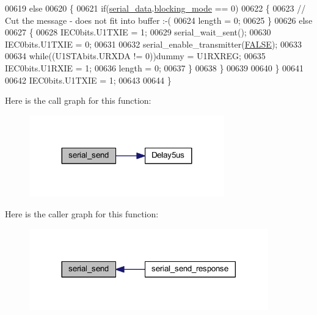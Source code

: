 \begin{DoxyCode}
00619         \textcolor{keywordflow}{else}
00620         \{
00621             \textcolor{keywordflow}{if}(\hyperlink{a00030_a77d3b77ccd59a0065642bf1ac7887b9d}{serial\_data}.\hyperlink{a00030_a758ac775caab1899af08024d4635f7e3}{blocking\_mode} == 0)
00622             \{
00623                 \textcolor{comment}{// Cut the message - does not fit into buffer :-(}
00624                 length = 0;
00625             \}
00626             \textcolor{keywordflow}{else}
00627             \{
00628                 IEC0bits.U1TXIE   = 1;
00629                 serial\_wait\_sent();
00630                 IEC0bits.U1TXIE   = 0;
00631 
00632                 serial\_enable\_transmitter(\hyperlink{a00040_aa93f0eb578d23995850d61f7d61c55c1}{FALSE});
00633 
00634                 \textcolor{keywordflow}{while}((U1STAbits.URXDA != 0))dummy = U1RXREG;
00635                 IEC0bits.U1RXIE   = 1;
00636                 length = 0;
00637             \}
00638         \}
00639 
00640     \}
00641 
00642     IEC0bits.U1TXIE   = 1;
00643 
00644 \}
\end{DoxyCode}


Here is the call graph for this function\+:
\nopagebreak
\begin{figure}[H]
\begin{center}
\leavevmode
\includegraphics[width=239pt]{d5/d79/a00030_a17f65cf9dbacdfb97cb2536ed0097ccb_cgraph}
\end{center}
\end{figure}




Here is the caller graph for this function\+:
\nopagebreak
\begin{figure}[H]
\begin{center}
\leavevmode
\includegraphics[width=293pt]{d5/d79/a00030_a17f65cf9dbacdfb97cb2536ed0097ccb_icgraph}
\end{center}
\end{figure}


